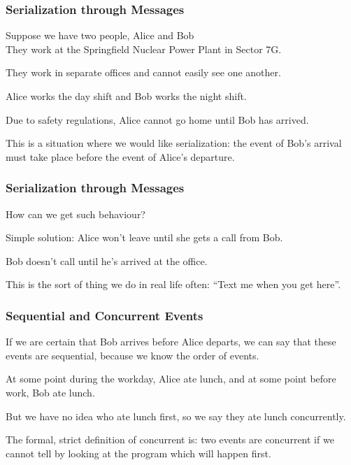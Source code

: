 \begin{frame}
	\frametitle{Serialization through Messages}

	Suppose we have two people, Alice and Bob\\
	\quad They work at the Springfield Nuclear Power Plant in Sector 7G.

	They work in separate offices and cannot easily see one another.

	Alice works the day shift and Bob works the night shift.

	Due to safety regulations, Alice cannot go home until Bob has arrived.

	This is a situation where we would like serialization: the event of Bob's arrival must take place before the event of Alice's departure.

\end{frame}

\begin{frame}
	\frametitle{Serialization through Messages}

	How can we get such behaviour?

	Simple solution: Alice won't leave until she gets a call from Bob.

	Bob doesn't call until he's arrived at the office.

	This is the sort of thing we do in real life often: ``Text me when you get here''.



\end{frame}

\begin{frame}
	\frametitle{Sequential and Concurrent Events}

	If we are certain that Bob arrives before Alice departs, we can say that these events are \alert{sequential}, because we know the order of events.

	At some point during the workday, Alice ate lunch, and at some point before work, Bob ate lunch.

	But we have no idea who ate lunch first, so we say they ate lunch \alert{concurrently}.

	The formal, strict definition of concurrent is: two events are concurrent if we cannot tell by looking at the program which will happen first.

\end{frame}

